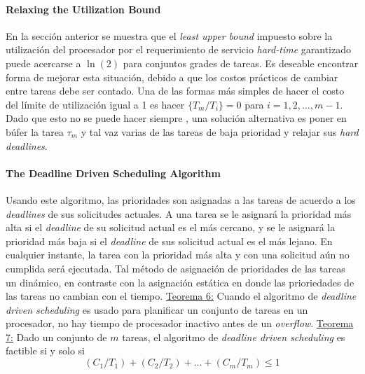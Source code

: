 \paragraph{\textnormal{\textbf{Relaxing the Utilization Bound}}}
En la sección anterior se muestra que el \emph{least upper bound} impuesto sobre la utilización del procesador por el requerimiento de servicio \emph{hard-time} garantizado puede acercarse a $\ln (2)$ para conjuntos grades de tareas. Es deseable encontrar forma de mejorar esta situación, debido a que los costos prácticos de cambiar entre tareas debe ser contado. Una de las formas más simples de hacer el costo del límite de utilización igual a 1 es hacer $\{T_m/T_i\} = 0$ para $i = 1,2,\dots,m - 1$. Dado que esto no se puede hacer siempre , una solución alternativa es poner en búfer la tarea $\tau_m$ y tal vaz varias de las tareas de baja prioridad y relajar sus \emph{hard deadlines}.


\paragraph{\textnormal{\textbf{The Deadline Driven Scheduling Algorithm}}}
Usando este algoritmo, las prioridades son asignadas a las tareas de acuerdo a los \emph{deadlines} de sus solicitudes actuales. A una tarea se le asignará la prioridad más alta si el \emph{deadline} de su solicitud actual es el más cercano, y se le asignará la prioridad más baja si el \emph{deadline} de sus solicitud actual es el más lejano. En cualquier instante, la tarea con la prioridad más alta y con una solicitud aún no cumplida será ejecutada. Tal método de asignación de prioridades de las tareas un dinámico, en contraste con la asignación estática en donde las prioriedades de las tareas no cambian con el tiempo. \underline{Teorema 6:} Cuando el algoritmo de \emph{deadline driven scheduling} es usado para planificar un conjunto de tareas en un procesador, no hay tiempo de procesador inactivo antes de un \emph{overflow}. \underline{Teorema 7:} Dado un conjunto de $m$ tareas, el algoritmo de \emph{deadline driven scheduling} es factible si y solo si $$(C_1/T_1) + (C_2/T_2) + \dots + (C_m/T_m) \leq 1$$

